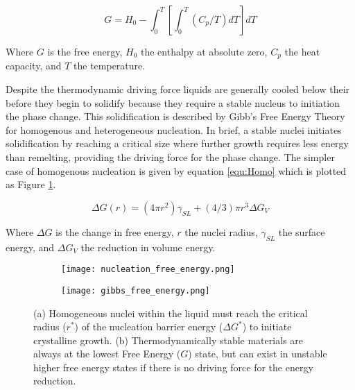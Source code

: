 \documentclass[a4paper,12pt,oneside]{report}%
\begin{document}
\begin{equation}
	G = H_{0}-\int_{0}^{T} 
	\left[
	\int_{0}^{T}(C_{p}/T) dT
	\right] dT
	\label{equ:Gibbs}
\end{equation}

Where $G$ is the free energy, $H_{0}$ the enthalpy at absolute zero, $C_{p}$ the heat capacity, and $T$ the temperature.

Despite the thermodynamic driving force liquids are generally cooled below their \Tm before they begin to solidify because they require a stable nucleus to initiation the phase change. This solidification is described by Gibb's Free Energy Theory for homogenous and heterogeneous nucleation. In brief, a stable nuclei initiates solidification by reaching a critical size where further growth requires less energy than remelting, providing the driving force for the phase change. The simpler case of homogenous nucleation is given by equation \ref{equ:Homo} which is plotted as Figure \ref{fig:GibbsNucleation}. 

\begin{equation}
\Delta G(r) = (4 \pi r^2 ) \gamma_{SL}+(4/3) \pi r^3 \Delta G_{V} 
\label{equ:Homo}
\end{equation}


Where $\Delta G$ is the change in free energy, $r$ the nuclei radius, $\gamma_{SL}$ the surface energy, and $\Delta G_{V}$ the reduction in volume energy.

\begin{figure}[bp]
	\centering
	\begin{subfigure}[htbp]{0.49\textwidth}
		\texttt{[image: nucleation\_free\_energy.png]}
		\caption{}
		\label{fig:GibbsNucleation}
	\end{subfigure}
	\begin{subfigure}[htbp]{0.49\textwidth}
		\texttt{[image: gibbs\_free\_energy.png]}
		\caption{}
		\label{fig:FreeEnergy}
	\end{subfigure}
	\caption[Homogenous Nucleation]{(a) Homogeneous nuclei within the liquid must reach the critical radius ($r^*$) of the nucleation barrier energy ($\Delta G^*$) to initiate crystalline growth. (b) Thermodynamically stable materials are always at the lowest Free Energy ($G$) state, but can exist in unstable higher free energy states if there is no driving force for the energy reduction.}%
	\label{fig:Gibbs}
\end{figure}
\end{document}
